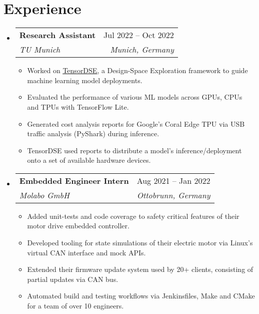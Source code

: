 \documentclass[letterpaper,11pt]{article}
\makeatletter
\newcommand{\resumeItem}[1]{
  \item\small{
    {#1 \vspace{-2pt}}
  }
}
\newcommand{\resumeSubheading}[4]{
  \vspace{-2pt}\item
    \begin{tabular*}{0.97\textwidth}[t]{l@{\extracolsep{\fill}}r}
      \textbf{#1} & #2 \\
      \textit{\small#3} & \textit{\small #4} \\
    \end{tabular*}\vspace{-7pt}
}
\newcommand{\resumeSubHeadingListStart}{\begin{itemize}[leftmargin=0.15in, label={}]}
\newcommand{\resumeSubHeadingListEnd}{\end{itemize}}
\newcommand{\resumeItemListStart}{\begin{itemize}}
\newcommand{\resumeItemListEnd}{\end{itemize}\vspace{-5pt}}
\makeatother
\begin{document}
\vspace{-14.0pt}

\section{Experience}
    \resumeSubHeadingListStart
        \resumeSubheading
            {Research Assistant}{Jul 2022 -- Oct 2022}
            {TU Munich}{Munich, Germany}
            \resumeItemListStart
                \resumeItem{Worked on \href{https://github.com/alxhoff/TensorDSE}{\underline{TensorDSE}}, a Design-Space Exploration framework to guide machine learning model deployments.}
                \resumeItem{Evaluated the performance of various ML models across GPUs, CPUs and TPUs with TensorFlow Lite.}
                \resumeItem{Generated cost analysis reports for Google's Coral Edge TPU via USB traffic analysis (PyShark) during inference.}
                \resumeItem{TensorDSE used reports to distribute a model's inference/deployment onto a set of available hardware devices.}
            \resumeItemListEnd
            \vspace{2.0pt}

        \resumeSubheading
            {Embedded Engineer Intern}{Aug 2021 -- Jan 2022}
            {Molabo GmbH}{Ottobrunn, Germany}
            \resumeItemListStart
                \resumeItem{Added unit-tests and code coverage to safety critical features of their motor drive embedded controller.}
                \resumeItem{Developed tooling for state simulations of their electric motor via Linux's virtual CAN interface and mock APIs.}
                \resumeItem{Extended their firmware update system used by 20+ clients, consisting of partial updates via CAN bus.}
                \resumeItem{Automated build and testing workflows via Jenkinsfiles, Make and CMake for a team of over 10 engineers.}
            \resumeItemListEnd

    \resumeSubHeadingListEnd 

\vspace{-8.0pt}
\end{document}
